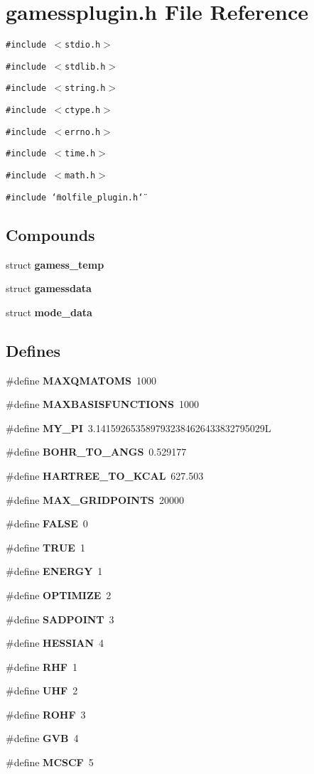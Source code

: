 \section{gamessplugin.h File Reference}
\label{gamessplugin_8h}
{\tt \#include $<$stdio.h$>$}\par
{\tt \#include $<$stdlib.h$>$}\par
{\tt \#include $<$string.h$>$}\par
{\tt \#include $<$ctype.h$>$}\par
{\tt \#include $<$errno.h$>$}\par
{\tt \#include $<$time.h$>$}\par
{\tt \#include $<$math.h$>$}\par
{\tt \#include \char`\"{}molfile\_\-plugin.h\char`\"{}}\par
\subsection*{Compounds}
\begin{CompactItemize}
\item 
struct {\bf gamess\_\-temp}
\item 
struct {\bf gamessdata}
\item 
struct {\bf mode\_\-data}
\end{CompactItemize}
\subsection*{Defines}
\begin{CompactItemize}
\item 
\#define {\bf MAXQMATOMS}\ 1000
\item 
\#define {\bf MAXBASISFUNCTIONS}\ 1000
\item 
\#define {\bf MY\_\-PI}\ 3.1415926535897932384626433832795029L
\item 
\#define {\bf BOHR\_\-TO\_\-ANGS}\ 0.529177
\item 
\#define {\bf HARTREE\_\-TO\_\-KCAL}\ 627.503
\item 
\#define {\bf MAX\_\-GRIDPOINTS}\ 20000
\item 
\#define {\bf FALSE}\ 0
\item 
\#define {\bf TRUE}\ 1
\item 
\#define {\bf ENERGY}\ 1
\item 
\#define {\bf OPTIMIZE}\ 2
\item 
\#define {\bf SADPOINT}\ 3
\item 
\#define {\bf HESSIAN}\ 4
\item 
\#define {\bf RHF}\ 1
\item 
\#define {\bf UHF}\ 2
\item 
\#define {\bf ROHF}\ 3
\item 
\#define {\bf GVB}\ 4
\item 
\#define {\bf MCSCF}\ 5
\end{CompactItemize}
